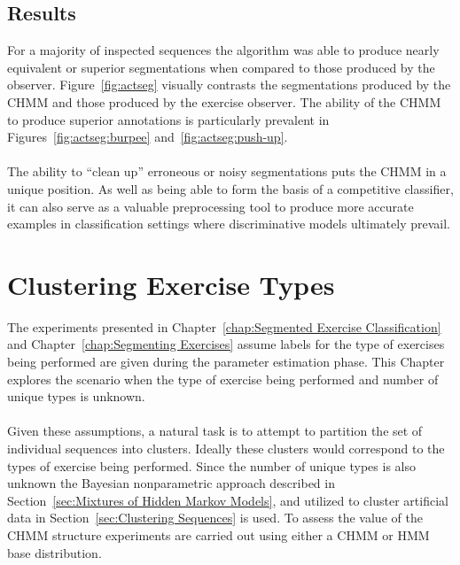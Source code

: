 \documentclass[12pt]{report}
\newcommand{\1}[0]{\mathbbm{1}}
\begin{document}
\section{Results}
For a majority of inspected sequences the algorithm was able to produce nearly
equivalent or superior segmentations when compared to those produced by the observer.
Figure~\ref{fig:actseg} visually contrasts the segmentations produced by the \ac{CHMM}
and those produced by the exercise observer. The ability of the \ac{CHMM} to produce
superior annotations is particularly prevalent in Figures~\ref{fig:actseg:burpee}
and~\ref{fig:actseg:push-up}.
\\\\
The ability to ``clean up'' erroneous or noisy segmentations puts the \ac{CHMM}
in a unique position. As well as being able to form the basis of a competitive classifier,
it can also serve as a valuable preprocessing tool to produce more accurate examples in
classification settings where discriminative models ultimately prevail.

\chapter{Clustering Exercise Types}
\label{chap:Clustering Exercise Types}
The experiments presented in Chapter~\ref{chap:Segmented Exercise Classification}
and Chapter~\ref{chap:Segmenting Exercises} assume labels for the type of exercises
being performed are given during the parameter estimation phase. This Chapter explores
the scenario when the type of exercise being performed and number of unique types is unknown.
\\\\
Given these assumptions, a natural task is to attempt to partition the
set of individual sequences into clusters. Ideally these clusters would
correspond to the types of exercise being performed. Since the number of
unique types is also unknown the Bayesian nonparametric approach described in
Section~\ref{sec:Mixtures of Hidden Markov Models}, and utilized to cluster
artificial data in Section~\ref{sec:Clustering Sequences} is used. To assess the
value of the \ac{CHMM} structure experiments are carried out using either a \ac{CHMM}
or \ac{HMM} base distribution.
\end{document}
